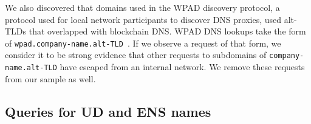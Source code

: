 
We also discovered that domains used in the WPAD discovery protocol, a protocol 
used for local network participants to discover DNS proxies, used alt-TLDs that 
overlapped with blockchain DNS. WPAD DNS lookups take the form of 
\texttt{wpad.company-name.alt-TLD}~\cite{chen_wpad_2016}. If we observe a 
request of that form, we consider it to be strong evidence that other requests 
to subdomains of \texttt{company-name.alt-TLD} have escaped from an internal 
network. We remove these requests from our sample as well. 

\subsection{Queries for UD and ENS names}

